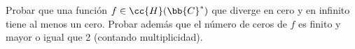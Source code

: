 \documentclass[12pt]{article}
\begin{document}
    \begin{ejercicio}[2.5 puntos]
        Probar que una función $f \in \cc{H}(\bb{C}^*)$ que diverge en cero y en infinito tiene al menos un cero. Probar además que el número de ceros de $f$ es finito y mayor o igual que 2 (contando multiplicidad).\\

        \begin{comment}

        Sea $f \in \cc{H}(\bb{C}^*)$ tal que:
        \begin{equation*}
            \lim_{z\to 0} f(z) = +\infty \qquad \text{y} \qquad \lim_{z\to +\infty} f(z) = +\infty.
        \end{equation*}

        Supongamos por reducción al absurdo que $f$ no tiene ceros. Entonces, podemos definir:
        \Func{g}{\bb{C}^*}{\bb{C}}{z}{\frac{1}{f(z)}}

        Notemos que $g$ es holomorfa en $\bb{C}^*$. Veamos cómo definirla en el origen:
        \begin{equation*}
            \lim_{z\to 0} g(z) = \lim_{z\to 0} \frac{1}{f(z)} = 0
        \end{equation*}
        donde hemos usado que $f(z) \to +\infty$ cuando $z\to 0$. Por tanto, podemos definir (notemos el abuso de notación):
        \Func{g}{\bb{C}}{\bb{C}}{z}{\begin{cases}
            0 & \text{si } z = 0 \\
            \frac{1}{f(z)} & \text{si } z \in \bb{C}^*.
        \end{cases}}

        Como $g\in \cc{H}(\bb{C}^*)$ y $g$ continua en el origen, por el Teorema de Extensión de Riemann, tenemos que $g\in \cc{H}(\bb{C})$. Veamos ahora que $g$ es acotada en $\bb{C}$. Para todo $R\in \bb{R}^+$, como $g$ es continua y $\ol{D}(0, R)$ es compacto, tenemos que $g\left(\ol{D}(0, R)\right)$ es acotado. Además, veamos el comportamiento de $g$ en el infinito:
        \begin{equation*}
            \lim_{z\to +\infty} g(z) = \lim_{z\to +\infty} \frac{1}{f(z)} = 0
        \end{equation*}
        donde hemos usado que $f(z) \to +\infty$ cuando $z\to +\infty$. Por tanto, tenemos que $g$ es acotada en $\bb{C}$. Por el Teorema de Liouville, tenemos que $g$ es constante, pero esto es una contradicción, puesto que $f$ no es constante. Por tanto, $f$ tiene al menos un cero. Por tanto, $\exists z_0\in \bb{C}^*$ y $g\in \cc{H}(\bb{C})$ con $g(z_0)\neq 0$ tal que:
        \begin{equation*}
            f(z)=(z-z_0)g(z)
        \end{equation*}


\end{comment}
\end{ejercicio}
\end{document}
